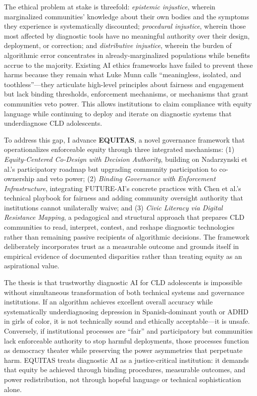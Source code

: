 \documentclass[12pt,letterpaper]{article}
\begin{document}
The ethical problem at stake is threefold: \textit{epistemic injustice}, wherein marginalized communities' knowledge about their own bodies and the symptoms they experience is systematically discounted;\cite{garcia_ed415} \textit{procedural injustice}, wherein those most affected by diagnostic tools have no meaningful authority over their design, deployment, or correction; and \textit{distributive injustice}, wherein the burden of algorithmic error concentrates in already-marginalized populations while benefits accrue to the majority.\cite{garcia_ed415} Existing AI ethics frameworks have failed to prevent these harms because they remain what Luke Munn calls ``meaningless, isolated, and toothless''---they articulate high-level principles about fairness and engagement but lack binding thresholds, enforcement mechanisms, or mechanisms that grant communities veto power.\cite{munn_idai700} This allows institutions to claim compliance with equity language while continuing to deploy and iterate on diagnostic systems that underdiagnose CLD adolescents.\cite{munn_idai700}

To address this gap, I advance \textbf{EQUITAS}, a novel governance framework that operationalizes enforceable equity through three integrated mechanisms: (1) \textit{Equity-Centered Co-Design with Decision Authority}, building on Nadarzynski et al.'s participatory roadmap but upgrading community participation to co-ownership and veto power;\cite{nadarzynski2024} (2) \textit{Binding Governance with Enforcement Infrastructure}, integrating FUTURE-AI's concrete practices \cite{lekadir2025} with Chen et al.'s technical playbook for fairness \cite{chen2023} and adding community oversight authority that institutions cannot unilaterally waive; and (3) \textit{Civic Literacy via Digital Resistance Mapping}, a pedagogical and structural approach that prepares CLD communities to read, interpret, contest, and reshape diagnostic technologies rather than remaining passive recipients of algorithmic decisions.\cite{garcia_ed415} The framework deliberately incorporates trust as a measurable outcome \cite{sagona2025} and grounds itself in empirical evidence of documented disparities \cite{marko2025} rather than treating equity as an aspirational value.

The thesis is that trustworthy diagnostic AI for CLD adolescents is impossible without simultaneous transformation of both technical systems and governance institutions. If an algorithm achieves excellent overall accuracy while systematically underdiagnosing depression in Spanish-dominant youth or ADHD in girls of color, it is not technically sound and ethically acceptable---it is unsafe.\cite{marko2025} Conversely, if institutional processes are ``fair'' and participatory but communities lack enforceable authority to stop harmful deployments, those processes function as democracy theater while preserving the power asymmetries that perpetuate harm.\cite{munn_idai700} EQUITAS treats diagnostic AI as a justice-critical institution: it demands that equity be achieved through binding procedures, measurable outcomes, and power redistribution, not through hopeful language or technical sophistication alone.
\end{document}
